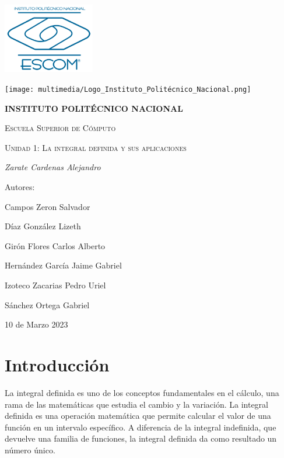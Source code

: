 \documentclass{article}
\begin{document}
\begin{titlepage}
  {\includegraphics[width=0.3\textwidth]{multimedia/ESCOM-Logo.png}}
  \hfill
  {\texttt{[image: multimedia/Logo\_Instituto\_Politécnico\_Nacional.png]}\par}
  \vspace{1cm}
  \centering
  {\bfseries\LARGE  INSTITUTO POLIT\'ECNICO NACIONAL\par}
  \vspace{1cm}
  {\scshape\LARGE Escuela Superior de C\'omputo\par}
  \vspace{1cm}
  {\scshape\Huge Unidad 1: La integral definida y sus aplicaciones \par}
  \vspace{2cm}
  {\itshape\Large Zarate Cardenas Alejandro\par}
  \vfill
  {\Large Autores:\par}
  {\Large Campos Zeron Salvador\par}
  {\Large Díaz González Lizeth\par}
  {\Large Girón Flores Carlos Alberto\par}
  {\Large Hernández García Jaime Gabriel\par}
  {\Large Izoteco Zacarias Pedro Uriel\par}
  {\Large S\'anchez Ortega Gabriel\par}
  \vfill
  {\Large 10 de Marzo 2023 \par}
\end{titlepage}

\renewcommand*\contentsname{Índice}
\tableofcontents
\newpage
\section{Introducción}

La integral definida es uno de los conceptos fundamentales en el cálculo, una rama de las matemáticas que estudia el cambio y la variación. La integral definida es una operación matemática que permite calcular el valor de una función en un intervalo específico. A diferencia de la integral indefinida, que devuelve una familia de funciones, la integral definida da como resultado un número único.
\end{document}
